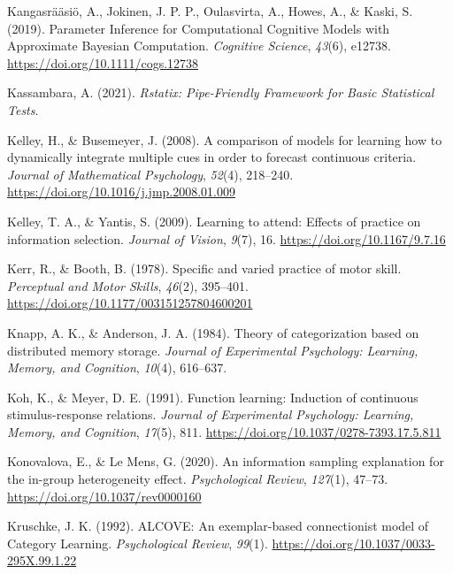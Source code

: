 \documentclass[
  11pt,
  letterpaper,
]{article}
\newlength{\cslhangindent}
\newenvironment{CSLReferences}[2] %
 {\begin{list}{}{%
  \setlength{\itemindent}{0pt}
  \setlength{\leftmargin}{0pt}
  \setlength{\parsep}{0pt}
  \ifodd #1
   \setlength{\leftmargin}{\cslhangindent}
   \setlength{\itemindent}{-1\cslhangindent}
  \fi
  \setlength{\itemsep}{#2\baselineskip}}}
 {\end{list}}
\begin{document}
\begin{CSLReferences}{1}{0}
Kangasrääsiö, A., Jokinen, J. P. P., Oulasvirta, A., Howes, A., \&
Kaski, S. (2019). Parameter {Inference} for {Computational Cognitive
Models} with {Approximate Bayesian Computation}. \emph{Cognitive
Science}, \emph{43}(6), e12738. \url{https://doi.org/10.1111/cogs.12738}

Kassambara, A. (2021). \emph{Rstatix: {Pipe-Friendly Framework} for
{Basic Statistical Tests}}.

Kelley, H., \& Busemeyer, J. (2008). A comparison of models for learning
how to dynamically integrate multiple cues in order to forecast
continuous criteria. \emph{Journal of Mathematical Psychology},
\emph{52}(4), 218--240. \url{https://doi.org/10.1016/j.jmp.2008.01.009}

Kelley, T. A., \& Yantis, S. (2009). Learning to attend: {Effects} of
practice on information selection. \emph{Journal of Vision},
\emph{9}(7), 16. \url{https://doi.org/10.1167/9.7.16}

Kerr, R., \& Booth, B. (1978). Specific and varied practice of motor
skill. \emph{Perceptual and Motor Skills}, \emph{46}(2), 395--401.
\url{https://doi.org/10.1177/003151257804600201}

Knapp, A. K., \& Anderson, J. A. (1984). Theory of categorization based
on distributed memory storage. \emph{Journal of Experimental Psychology:
Learning, Memory, and Cognition}, \emph{10}(4), 616--637.

Koh, K., \& Meyer, D. E. (1991). Function learning: {Induction} of
continuous stimulus-response relations. \emph{Journal of Experimental
Psychology: Learning, Memory, and Cognition}, \emph{17}(5), 811.
\url{https://doi.org/10.1037/0278-7393.17.5.811}

Konovalova, E., \& Le Mens, G. (2020). An information sampling
explanation for the in-group heterogeneity effect. \emph{Psychological
Review}, \emph{127}(1), 47--73. \url{https://doi.org/10.1037/rev0000160}

Kruschke, J. K. (1992). {ALCOVE}: {An} exemplar-based connectionist
model of {Category Learning}. \emph{Psychological Review}, \emph{99}(1).
\url{https://doi.org/10.1037/0033-295X.99.1.22}


\end{CSLReferences}
\end{document}
